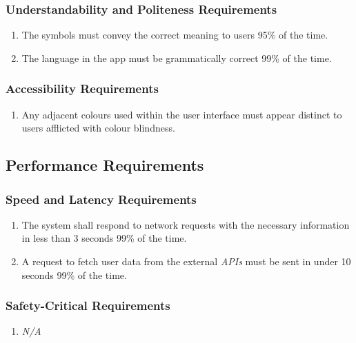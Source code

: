 \documentclass{article}
\begin{document}
	\subsubsection{Understandability and Politeness Requirements}
	\label{ssub:understandability_and_politeness_requirements}
	\begin{enumerate}[{UH}1. ]
		\item The symbols must convey the correct meaning to users 95\% of the time.
		\item The language in the app must be grammatically correct 99\% of the time.
	\end{enumerate}
	
	\subsubsection{Accessibility Requirements}
	\label{ssub:accessibility_requirements}
	\begin{enumerate}[{UH}1.]
		\item Any adjacent colours used within the user interface must appear distinct to users afflicted with colour blindness.
	\end{enumerate}
	
	\subsection{Performance Requirements}
	\label{sub:performance_requirements}
	
	\subsubsection{Speed and Latency Requirements}
	\label{ssub:speed_and_latency_requirements}
	\begin{enumerate}[{PR}1. ]
		\item The system shall respond to network requests with the necessary information in less than 3 seconds 99\% of the time.
		\item A request to fetch user data from the external \textit{APIs} must be sent in under 10 seconds 99\% of the time.
	\end{enumerate}
	
	\subsubsection{Safety-Critical Requirements}
	\label{ssub:safety_critical_requirements}
	\begin{enumerate}[{PR}1. ]
		\item \emph{N/A}
	\end{enumerate}
	
\end{document}
